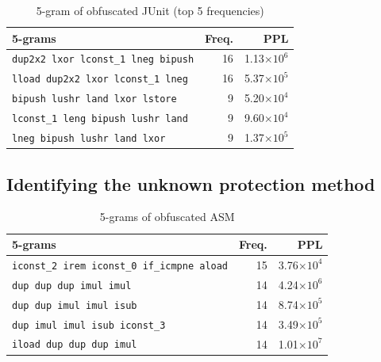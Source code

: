 \documentclass[conference]{IEEEtran}
\begin{document}

\begin{table}[t]
  \centering
  \footnotesize{
    \caption{5-gram of obfuscated JUnit (top 5 frequencies)}\label{table:junit}
  \begin{tabular}{l|r|r}
    \textbf{5-grams} & \textbf{Freq.} & \textbf{PPL}\\ \hline
    \texttt{dup2x2 lxor lconst\_1 lneg bipush}   & 16 & 1.13$\times10^6$ \\
    \texttt{lload dup2x2 lxor lconst\_1 lneg}    & 16 & 5.37$\times10^5$ \\
    \texttt{bipush lushr land lxor lstore}       &  9 & 5.20$\times10^4$ \\
    \texttt{lconst\_1 leng bipush lushr land}    &  9 & 9.60$\times10^4$ \\
    \texttt{lneg bipush lushr land lxor}         &  9 & 1.37$\times10^5$ \\
  \end{tabular}}
\end{table}

\subsection{Identifying the unknown protection method}

\begin{table}[t]
  \centering
  \footnotesize{
    \caption{5-grams of obfuscated ASM}\label{table:asm}
  \begin{tabular}{l|r|r}
    \textbf{5-grams} & \textbf{Freq.} & \textbf{PPL}\\ \hline
    \texttt{iconst\_2 irem iconst\_0 if\_icmpne aload}  & 15 & 3.76$\times10^4$ \\
    \texttt{dup dup dup imul imul}                      & 14 & 4.24$\times10^6$ \\
    \texttt{dup dup imul imul isub}                     & 14 & 8.74$\times10^5$ \\
    \texttt{dup imul imul isub iconst\_3}               & 14 & 3.49$\times10^5$ \\
    \texttt{iload dup dup dup imul}                     & 14 & 1.01$\times10^7$ \\
    \end{tabular}}
\end{table}
\end{document}
